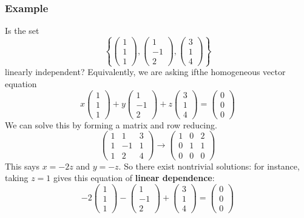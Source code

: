 \documentclass[10pt]{article}
\begin{document}
\subsubsection*{Example}
Is the set 
\[\left\{\begin{pmatrix} 1 \\ 1 \\ 1 \end{pmatrix}, \begin{pmatrix} 1 \\ -1 \\ 2 \end{pmatrix}, \begin{pmatrix} 3 \\ 1 \\ 4 \end{pmatrix}\right\}\]
linearly independent?  Equivalently, we are asking ifthe homogeneous vector equation
\[x \begin{pmatrix} 1 \\ 1 \\ 1 \end{pmatrix} + y \begin{pmatrix} 1 \\ -1 \\ 2 \end{pmatrix} + z \begin{pmatrix} 3 \\ 1 \\ 4 \end{pmatrix} = \begin{pmatrix} 0 \\ 0 \\ 0 \end{pmatrix}\]
We can solve this by forming a matrix and row reducing.
\[\begin{pmatrix} 1 & 1 & 3 \\ 1 & -1 & 1 \\ 1 & 2 & 4 \end{pmatrix} \longrightarrow \begin{pmatrix} 1 & 0 & 2 \\ 0 & 1 & 1 \\ 0 & 0 & 0 \end{pmatrix}\]
This says $x = -2z$ and $y = -z$.  So there exist nontrivial solutions: for instance, taking $z = 1$ gives this equation of \textbf{linear dependence}:
\[-2 \begin{pmatrix} 1 \\ 1 \\ 1 \end{pmatrix} - \begin{pmatrix} 1 \\ -1 \\ 2 \end{pmatrix} + \begin{pmatrix} 3 \\ 1 \\ 4 \end{pmatrix} = \begin{pmatrix} 0 \\ 0 \\ 0 \end{pmatrix}\]
\end{document}
